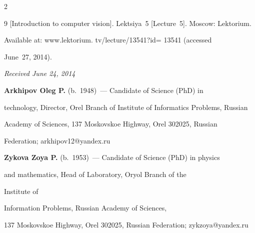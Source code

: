 \begin{multicols}{2}
{{\begin{thebibliography}{9}
[Introduction to computer vision]. Lektsiya~5 [Lecture~5]. Moscow: Lektorium.

Available at: {\sf www.lektorium. tv/lecture/13541?id= 13541} (accessed

June~27, 2014).



\end{thebibliography}



 }

 }



\end{multicols}



\vspace*{-6pt}



\hfill{\small\textit{Received June 24, 2014}}



\vspace*{-18pt}



\Contr



\noindent

  \textbf{Arkhipov Oleg P.} (b.\ 1948)~--- Candidate of Science (PhD) in

technology, Director, Orel Branch of Institute of Informatics Problems, Russian

Academy of Sciences, 137 Moskovskoe Highway, Orel 302025, Russian

Federation; arkhipov12@yandex.ru



\vspace*{3pt}



\noindent

\textbf{Zykova Zoya P.} (b.\ 1953)~--- Candidate of Science (PhD) in physics

and mathematics, Head of Laboratory, Oryol Branch of the

Institute of

Information Problems, Russian Academy of Sciences,

137 Moskovskoe Highway, Orel 302025, Russian Federation; zykzoya@yandex.ru









\label{end\stat}



\renewcommand{\bibname}{\protect\rm Литература}